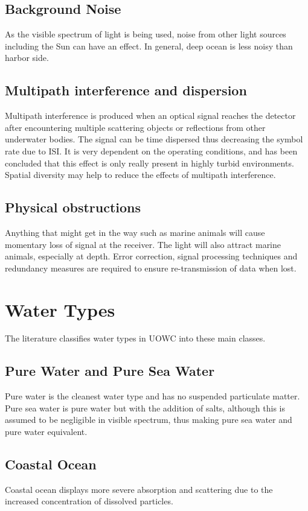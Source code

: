 \documentclass{article}
\begin{document}
\subsection{Background Noise}
As the visible spectrum of light is being used, noise from other light sources including the Sun can have an effect. In general, deep ocean is less noisy than harbor side.

\subsection{Multipath interference and dispersion}
Multipath interference is produced when an optical signal reaches the detector after encountering multiple scattering objects or reflections from other underwater bodies. The signal can be time dispersed thus decreasing the symbol rate due to \ac{ISI}. It is very dependent on the operating conditions, and has been concluded that this effect is only really present in highly turbid environments. Spatial diversity may help to reduce the effects of multipath interference.

\subsection{Physical obstructions}
Anything that might get in the way such as marine animals will cause momentary loss of signal at the receiver. The light will also attract marine animals, especially at depth. Error correction, signal processing techniques and redundancy measures are required to ensure re-transmission of data when lost.



\section{Water Types}
The literature classifies water types in \ac{UOWC} into these main classes.

\subsection{Pure Water and Pure Sea Water}
Pure water is the cleanest water type and has no suspended particulate matter. Pure sea water is pure water but with the addition of salts, although this is assumed to be negligible in visible spectrum, thus making pure sea water and pure water equivalent.

\subsection{Coastal Ocean}
Coastal ocean displays more severe absorption and scattering due to the increased concentration of dissolved particles.
\end{document}
